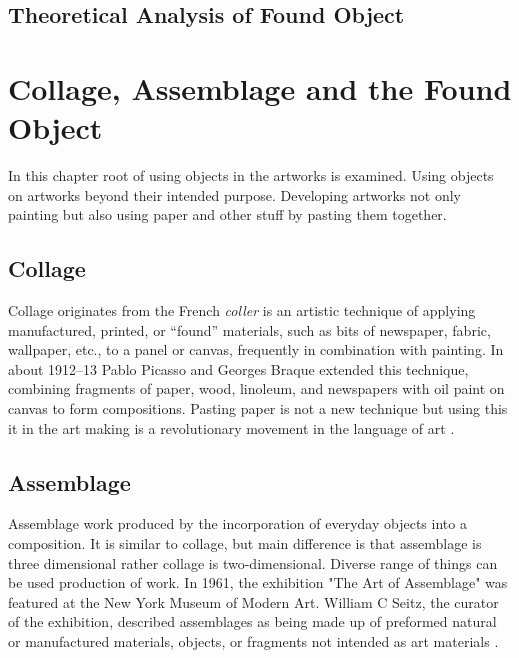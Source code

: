 \documentclass[12pt]{article}
\begin{document}
\subsection{Theoretical Analysis of Found Object}

\section{Collage, Assemblage and the Found Object}
In this chapter root of using objects in the artworks is examined. Using objects on artworks beyond their intended purpose. Developing artworks not only painting but also using paper and other stuff by pasting them together.

\subsection{Collage}
Collage originates from the French \textit{coller} is an artistic technique of applying manufactured, printed, or “found” materials, such as bits of newspaper, fabric, wallpaper, etc., to a panel or canvas, frequently in combination with painting. In about 1912–13 Pablo Picasso and Georges Braque extended this technique, combining fragments of paper, wood, linoleum, and newspapers with oil paint on canvas to form compositions. Pasting paper is not a new technique but using this it in the art making is a revolutionary movement in the  language of art \cite{waldman1992collage}.

\cite{greenberg1984collage}

\subsection{Assemblage}
Assemblage work produced by the incorporation of everyday objects into a composition. It is similar to collage, but main difference is that assemblage is three dimensional rather collage is two-dimensional. Diverse range of things can be used production of work. In 1961, the exhibition "The Art of Assemblage" was featured at the New York Museum of Modern Art. William C Seitz, the curator of the exhibition, described assemblages as being made up of preformed natural or manufactured materials, objects, or fragments not intended as art materials \cite{seitz1961art}.

\end{document}
